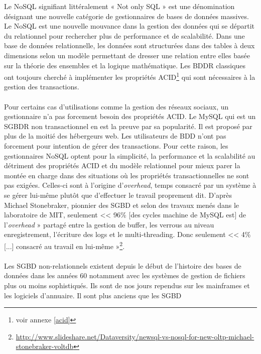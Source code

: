 Le \textsf{NoSQL} signifiant littéralement « \textsf{Not only SQL} »
est une dénomination désignant une nouvelle catégorie de gestionnaires
de bases de données massives. Le \textsf{NoSQL} est une nouvelle
mouvance dans la gestion des données qui se départit du relationnel 
pour rechercher plus de performance et de scalabilité. Dans une
base de données relationnelle, les données sont structurées dans des
tables à deux dimensions selon un modèle permettant de dresser une
relation entre elles basée sur la théorie des ensembles et la logique
mathématique. Les \textsf{BDDR} classiques ont toujours cherché à
implémenter les propriétés \textsf{ACID}\footnote{voir annexe
  \ref{acid}} qui sont nécessaires à la gestion des
transactions.  
\\ 
\\ 
Pour certains cas d'utilisations comme la gestion des réseaux sociaux,
un gestionnaire n'a pas forcement besoin des
propriétés \textsf{ACID}. Le
\textsf{MySQL} qui est un \textsf{SGBDR} non transactionnel en est la
preuve par sa popularité. Il est proposé par plus de la moitié des
hébergeurs \textsf{web}. Les utilisateurs de \textsf{BDD} n'ont pas
forcement pour intention de gérer des transactions. Pour cette raison,
les gestionnaires \textsf{NoSQL} optent pour la simplicité, la
performance et la scalabilité au détriment des propriétés
\textsf{ACID} et du modèle relationnel pour mieux parer la montée en
charge dans des situations où les propriétés transactionnelles ne sont
pas exigées. Celles-ci sont à l'origine d'\textit{overhead}, temps
consacré par un système à se gérer lui-même plutôt que d'effectuer le
travail proprement dit. D'après \textsf{Michael Stonebraker}, pionnier
des \textsf{SGBD} et selon des travaux menés dans le laboratoire
de \textsf{MIT}, seulement << 96\% [des cycles machine
de \textsf{MySQL} est] de l’\textit{overhead} » partagé entre la
gestion de \textsf{buffer}, les verrous au niveau enregistrement,
l’écriture des \textsf{logs} et le \textsf{multi-threading}. Donc
seulement << 4\% [...] consacré au travail en lui-même
»\footnote{\url{http://www.slideshare.net/Dataversity/newsql-vs-nosql-for-new-oltp-michael-stonebraker-voltdb}}.
\\ 
\\ 
Les \textsf{SGBD} non-relationnels existent depuis
le début de l'histoire des bases de données dans les années $60$
notamment avec les systèmes de gestion de fichiers plus ou moins
sophistiqués. Ils sont de nos jours rependus sur les mainframes et les
logiciels d'annuaire. Il sont plus anciens que les \textsf{SGBD}

